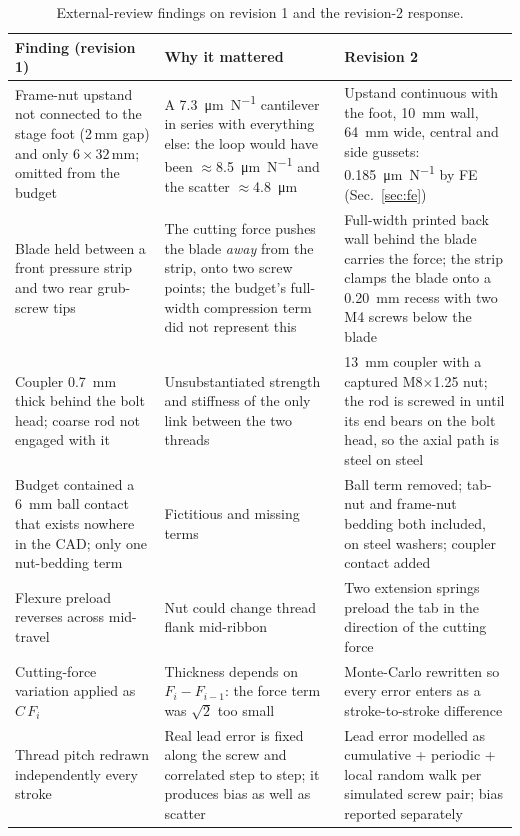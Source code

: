 \documentclass[11pt,a4paper]{article}
\begin{document}
\begin{table}[!htbp]\small\centering
\caption{External-review findings on revision 1 and the revision-2 response.}
\label{tab:rev2}
\begin{tabularx}{\linewidth}{@{}p{3.6cm}XX@{}}
\toprule
Finding (revision 1) & Why it mattered & Revision 2 \\
\midrule
Frame-nut upstand not connected to the stage foot (2\,mm gap) and only $6\times32$\,mm; omitted from the budget & A \SI{7.3}{\micro\metre\per\newton} cantilever in series with everything else: the loop would have been $\approx$\SI{8.5}{\micro\metre\per\newton} and the scatter $\approx$\SI{4.8}{\micro\metre} & Upstand continuous with the foot, \SI{10}{\milli\metre} wall, \SI{64}{\milli\metre} wide, central and side gussets: \SI{0.185}{\micro\metre\per\newton} by FE (Sec.~\ref{sec:fe}) \\
Blade held between a front pressure strip and two rear grub-screw tips & The cutting force pushes the blade \emph{away} from the strip, onto two screw points; the budget's full-width compression term did not represent this & Full-width printed back wall behind the blade carries the force; the strip clamps the blade onto a \SI{0.20}{\milli\metre} recess with two M4 screws below the blade \\
Coupler \SI{0.7}{\milli\metre} thick behind the bolt head; coarse rod not engaged with it & Unsubstantiated strength and stiffness of the only link between the two threads & \SI{13}{\milli\metre} coupler with a captured M8$\times$1.25 nut; the rod is screwed in until its end bears on the bolt head, so the axial path is steel on steel \\
Budget contained a \SI{6}{\milli\metre} ball contact that exists nowhere in the CAD; only one nut-bedding term & Fictitious and missing terms & Ball term removed; tab-nut and frame-nut bedding both included, on steel washers; coupler contact added \\
Flexure preload reverses across mid-travel & Nut could change thread flank mid-ribbon & Two extension springs preload the tab in the direction of the cutting force \\
Cutting-force variation applied as $C\,F_i$ & Thickness depends on $F_i-F_{i-1}$: the force term was $\sqrt2$ too small & Monte-Carlo rewritten so every error enters as a stroke-to-stroke difference \\
Thread pitch redrawn independently every stroke & Real lead error is fixed along the screw and correlated step to step; it produces bias as well as scatter & Lead error modelled as cumulative + periodic + local random walk per simulated screw pair; bias reported separately \\

\end{tabularx}
\end{table}
\end{document}
